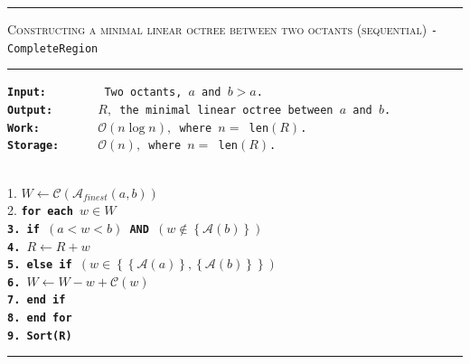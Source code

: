 \begin{table}
\centering
\rule{\textwidth}{0.01mm}
\begin{algorithm}{ \textsc{Constructing a minimal linear octree between two octants (sequential)} \tt{- CompleteRegion}}
\rule{\textwidth}{0.01mm}
\flushleft
\tt{\bf{Input:~~~~~~~~}} Two octants, $a$ and  $b > a$.\\
\tt{\bf{Output:~~~~~~}} $R,$ the minimal linear octree between $a$ and $b$.\\
\tt{\bf{Work:~~~~~~~~}} $\mathcal{O}(n\log n),$ where $n = $ len$(R)$.\\
\tt{\bf{Storage:~~~~~}} $\mathcal{O}(n),$ where $n = $ len$(R)$.\\
  ~\\
\begin{tabbing}  
1. {\tt $W \leftarrow  \mathcal{C}(\mathcal{A}_{finest}\left(a,b\right))$}\\
2. \tt{\bf{for}} \= \bf{each} {$w \in W$}\\
3.      \> \tt{\bf {if}} \= \tt{$\left(a < w < b\right)$ AND $\left(w \notin \left\{\mathcal{A}(b)\right\}\right)$}\\
4.      \> \> $R \leftarrow R + w$\\
5.      \> \tt{\bf {else if}} \= {$\left(w \in \left\{\left\{\mathcal{A}(a)\right\},\left\{\mathcal{A}(b)\right\}\right\}\right)$}\\
6.      \> \> $W \leftarrow W - w + \mathcal{C}(w)$\\
7.			\> \tt{\bf{end if}}\\
8. \tt{\bf{end for}}\\
9. Sort(R)
\end{tabbing}
\label{alg:compReg}
\end{algorithm}
\rule{\textwidth}{0.01mm}
\end{table}

